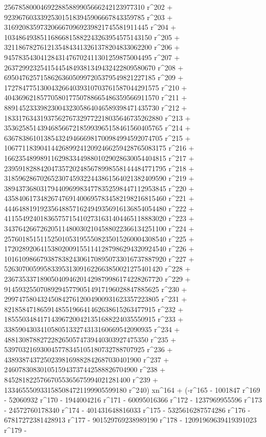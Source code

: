        256785800046922885889905666242123977310 r^202 + 
       923967603339253015183945906667843359785 r^203 + 
       3169208359732066670969239821745581911445 r^204 + 
       10348649385116866815882243263954575143150 r^205 + 
       32118678276121354843413261378204833062200 r^206 + 
       94578354304128431476702411301259875004495 r^207 + 
       263729923254154454849381349432422809580670 r^208 + 
       695047625715862636050997205379549821227185 r^209 + 
       1727847751300432664039310703761587044291575 r^210 + 
       4043696218577058017750788665486359566911570 r^211 + 
       8891452333982300432305864046589398471435730 r^212 + 
       18331763431937562767329772218035646735262880 r^213 + 
       35362585143946856672185993965158461560405765 r^214 + 
       63678386101385432494666981700984994592074705 r^215 + 
       106771183904144268992412092466259428765083175 r^216 + 
       166235489989116298334498801029028630054404815 r^217 + 
       239591828842047357202485678998558144484771795 r^218 + 
       318596286702652307459322443861564021382409590 r^219 + 
       389437368031794409699834778352598447112953845 r^220 + 
       435840617348267476914006957834582198216815460 r^221 + 
       444648819192356488571624949356916136854054480 r^222 + 
       411554924018365757154102731631404465118883020 r^223 + 
       343764266726205114800302104588022366134251100 r^224 + 
       257601851511525010531955508235015260004308540 r^225 + 
       172028920641538020091551141287986294320924540 r^226 + 
       101610986679387838243061708950733016737887920 r^227 + 
       52630700599583395313091622663850021275401420 r^228 + 
       23673533718905040946201429879986174228267720 r^229 + 
       9145932550708929457790514917196028847885625 r^230 + 
       2997475804324508427612004900931623357223805 r^231 + 
       821858471865914855196641462638615263477915 r^232 + 
       185550348417143967200421351688224035550915 r^233 + 
       33859043034105805133274313160669542090935 r^234 + 
       4881308788272282650574739440303927475350 r^235 + 
       539703216930045778345105180732788707925 r^236 + 
       43893874372502398169882842687030401900 r^237 + 
       2460783083010515943737442588826704900 r^238 + 
       84528182257667055365675994021281400 r^239 + 
       1334655509331585084721199905599180 r^240) xn^164 + (-r^165 - 
       1001847 r^169 - 52060932 r^170 - 1944004216 r^171 - 
       60095016366 r^172 - 1237969955596 r^173 - 
       24572760178340 r^174 - 401431648816033 r^175 - 
       5325616287574286 r^176 - 67817272381428913 r^177 - 
       901529769238989190 r^178 - 12091969639419391023 r^179 - 
